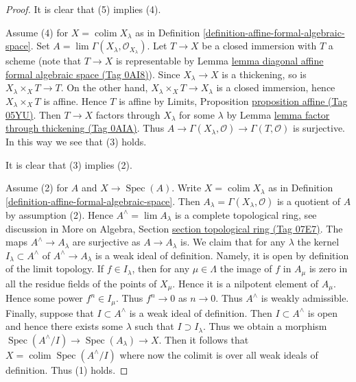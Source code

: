 \documentclass{amsart}
\theoremstyle{plain}
\theoremstyle{definition}
\theoremstyle{remark}
\numberwithin{equation}{subsection}
\def\lim{\mathop{\mathrm{lim}}\nolimits}
\def\colim{\mathop{\mathrm{colim}}\nolimits}
\def\Spec{\mathop{\mathrm{Spec}}}
\begin{document}
\begin{proof}
It is clear that (5) implies (4).

\medskip\noindent
Assume (4) for $X = \colim X_\lambda$ as in
Definition \ref{definition-affine-formal-algebraic-space}.
Set $A = \lim \Gamma(X_\lambda, \mathcal{O}_{X_\lambda})$.
Let $T \to X$ be a closed immersion with $T$ a scheme
(note that $T \to X$ is representable by
Lemma \href{https://stacks.math.columbia.edu/tag/0AI8}{lemma diagonal affine formal algebraic space (Tag 0AI8)}).
Since $X_\lambda \to X$ is a thickening, so is
$X_\lambda \times_X T \to T$. On the other hand,
$X_\lambda \times_X T \to X_\lambda$ is a closed immersion,
hence $X_\lambda \times_X T$ is affine. Hence $T$ is affine
by Limits, Proposition \href{https://stacks.math.columbia.edu/tag/05YU}{proposition affine (Tag 05YU)}.
Then $T \to X$ factors through $X_\lambda$ for some $\lambda$
by Lemma \href{https://stacks.math.columbia.edu/tag/0AIA}{lemma factor through thickening (Tag 0AIA)}.
Thus $A \to \Gamma(X_\lambda, \mathcal{O}) \to \Gamma(T, \mathcal{O})$
is surjective. In this way we see that (3) holds.

\medskip\noindent
It is clear that (3) implies (2).

\medskip\noindent
Assume (2) for $A$ and $X \to \Spec(A)$. Write $X = \colim X_\lambda$
as in Definition \ref{definition-affine-formal-algebraic-space}.
Then $A_\lambda = \Gamma(X_\lambda, \mathcal{O})$ is a quotient
of $A$ by assumption (2). Hence $A^\wedge = \lim A_\lambda$
is a complete topological ring, see discussion in
More on Algebra, Section \href{https://stacks.math.columbia.edu/tag/07E7}{section topological ring (Tag 07E7)}.
The maps $A^\wedge \to A_\lambda$ are surjective as $A \to A_\lambda$ is.
We claim that for any $\lambda$ the kernel $I_\lambda \subset A^\wedge$ of
$A^\wedge \to A_\lambda$ is a weak ideal of definition.
Namely, it is open by definition of the limit topology.
If $f \in I_\lambda$, then for any $\mu \in \Lambda$
the image of $f$ in $A_\mu$ is zero in all the residue fields
of the points of $X_\mu$. Hence it is a nilpotent element
of $A_\mu$. Hence some power $f^n \in I_\mu$. Thus $f^n \to 0$
as $n \to 0$. Thus $A^\wedge$ is weakly admissible.
Finally, suppose that $I \subset A^\wedge$ is a weak ideal
of definition. Then $I \subset A^\wedge$ is open and hence there exists
some $\lambda$ such that $I \supset I_\lambda$. Thus we obtain a morphism
$\Spec(A^\wedge/I) \to \Spec(A_\lambda) \to X$.
Then it follows that $X = \colim \Spec(A^\wedge/I)$ where now
the colimit is over all weak ideals of definition.
Thus (1) holds.


\end{proof}
\end{document}

